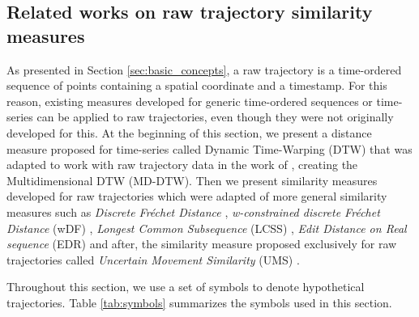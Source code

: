 \subsection{Related works on raw trajectory similarity measures} \label{sec:related_raw}
As presented in Section {\ref{sec:basic_concepts},} a raw trajectory is a time-ordered sequence of points containing a spatial coordinate and a timestamp. For this reason, existing measures developed for generic time-ordered sequences or time-series can be applied to raw trajectories, even though they were not originally developed for this. At the beginning of this section, we present a distance measure proposed for time-series  called Dynamic Time-Warping (DTW)\cite{berndt1994using} that was adapted to work with raw trajectory data in the work of \cite{ten2007multi}, creating the Multidimensional DTW (MD-DTW). Then we present similarity measures developed for raw trajectories which were adapted of more general similarity measures such as \textit{Discrete Fr{\'e}chet Distance} \cite{eiter1994computing}, \textit{w-constrained discrete Fr{\'e}chet Distance} (wDF) \cite{Ding:2008:ESJ:1440463.1440989}, \textit{Longest Common Subsequence} (LCSS) \cite{vlachos2002discovering}, \textit{Edit Distance on Real sequence} (EDR) \cite{Chen:2005:RFS:1066157.1066213} and after, the similarity measure proposed exclusively for raw trajectories called \textit{Uncertain Movement Similarity} (UMS) \cite{Furtado-UMS-2018}.

Throughout this section, we use a set of symbols to denote hypothetical trajectories. Table \ref{tab:symbols} summarizes the symbols used in this section.

\begin{table}[!h]
    \centering
    \caption{Symbol meanings}
    \label{tab:symbols}
\end{table}

